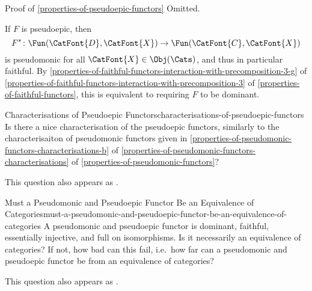 \begin{Proof}{Proof of \cref{properties-of-pseudoepic-functors}}%
    Omitted.

    If $F$ is pseudoepic, then
    \[
        F^{*}%
        \colon%
        \Fun(\CatFont{D},\CatFont{X})%
        \to%
        \Fun(\CatFont{C},\CatFont{X})%
    \]%
    is pseudomonic for all $\CatFont{X}\in\Obj(\Cats)$, and thus in particular faithful. By \cref{properties-of-faithful-functors-interaction-with-precomposition-3-g} of \cref{properties-of-faithful-functors-interaction-with-precomposition-3} of \cref{properties-of-faithful-functors}, this is equivalent to requiring $F$ to be dominant.
\end{Proof}
\begin{question}{Characterisations of Pseudoepic Functors}{characterisations-of-pseudoepic-functors}%
    Is there a nice characterisation of the pseudoepic functors, similarly to the characterisaiton of pseudomonic functors given in \cref{properties-of-pseudomonic-functors-characterisations-b} of \cref{properties-of-pseudomonic-functors-characterisations} of \cref{properties-of-pseudomonic-functors}?

    This question also appears as \cite{MO321971}.
\end{question}
\begin{question}{Must a Pseudomonic and Pseudoepic Functor Be an Equivalence of Categories}{must-a-pseudomonic-and-pseudoepic-functor-be-an-equivalence-of-categories}%
    A pseudomonic and pseudoepic functor is dominant, faithful, essentially injective, and full on isomorphisms. Is it necessarily an equivalence of categories? If not, how bad can this fail, i.e.\ how far can a pseudomonic and pseudoepic functor be from an equivalence of categories?

    This question also appears as \cite{MO468334}.
\end{question}
